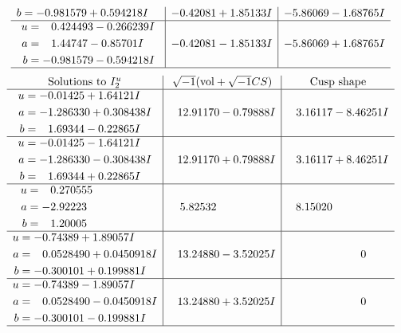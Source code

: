 \documentclass[1p]{elsarticle_modified}
\theoremstyle{definition}
\newcommand{\I}{\sqrt{-1}}
\begin{document}
$$\begin{array}{c|c|c}
\begin{aligned}
b &= -0.981579 + 0.594218 I\end{aligned}
 & -0.42081 + 1.85133 I & -5.86069 - 1.68765 I \\ \hline\begin{aligned}
u &= \phantom{-}0.424493 - 0.266239 I \\
a &= \phantom{-}1.44747 - 0.85701 I \\
b &= -0.981579 - 0.594218 I\end{aligned}
 & -0.42081 - 1.85133 I & -5.86069 + 1.68765 I\\
 \hline 
 \end{array}$$\newpage$$\begin{array}{c|c|c}  
\text{Solutions to }I^u_{2}& \I (\text{vol} + \sqrt{-1}CS) & \text{Cusp shape}\\
 \hline 
\begin{aligned}
u &= -0.01425 + 1.64121 I \\
a &= -1.286330 + 0.308438 I \\
b &= \phantom{-}1.69344 - 0.22865 I\end{aligned}
 & \phantom{-}12.91170 - 0.79888 I & \phantom{-}3.16117 - 8.46251 I \\ \hline\begin{aligned}
u &= -0.01425 - 1.64121 I \\
a &= -1.286330 - 0.308438 I \\
b &= \phantom{-}1.69344 + 0.22865 I\end{aligned}
 & \phantom{-}12.91170 + 0.79888 I & \phantom{-}3.16117 + 8.46251 I \\ \hline\begin{aligned}
u &= \phantom{-}0.270555\phantom{ +0.000000I} \\
a &= -2.92223\phantom{ +0.000000I} \\
b &= \phantom{-}1.20005\phantom{ +0.000000I}\end{aligned}
 & \phantom{-}5.82532\phantom{ +0.000000I} & \phantom{-}8.15020\phantom{ +0.000000I} \\ \hline\begin{aligned}
u &= -0.74389 + 1.89057 I \\
a &= \phantom{-}0.0528490 + 0.0450918 I \\
b &= -0.300101 + 0.199881 I\end{aligned}
 & \phantom{-}13.24880 - 3.52025 I & \phantom{-0.000000 } 0 \\ \hline\begin{aligned}
u &= -0.74389 - 1.89057 I \\
a &= \phantom{-}0.0528490 - 0.0450918 I \\
b &= -0.300101 - 0.199881 I\end{aligned}
 & \phantom{-}13.24880 + 3.52025 I & \phantom{-0.000000 } 0\\
 \hline 
 \end{array}$$\newpage\newpage\renewcommand{\arraystretch}{1}
\end{document}
